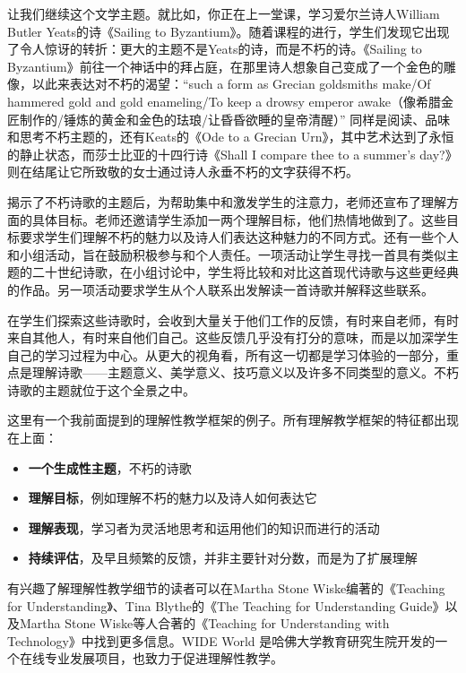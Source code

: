 让我们继续这个文学主题。就比如，你正在上一堂课，学习爱尔兰诗人William Butler Yeats的诗《Sailing to Byzantium》。随着课程的进行，学生们发现它出现了令人惊讶的转折：更大的主题不是Yeats的诗，而是不朽的诗。《Sailing to Byzantium》前往一个神话中的拜占庭，在那里诗人想象自己变成了一个金色的雕像，以此来表达对不朽的渴望：“such a form as Grecian goldsmiths make/Of hammered gold and gold enameling/To keep a drowsy emperor awake（像希腊金匠制作的/锤炼的黄金和金色的珐琅/让昏昏欲睡的皇帝清醒）” 同样是阅读、品味和思考不朽主题的，还有Keats的《Ode to a Grecian Urn》，其中艺术达到了永恒的静止状态，而莎士比亚的十四行诗《Shall I compare thee to a summer’s day?》则在结尾让它所致敬的女士通过诗人永垂不朽的文字获得不朽。

揭示了不朽诗歌的主题后，为帮助集中和激发学生的注意力，老师还宣布了理解方面的具体目标。老师还邀请学生添加一两个理解目标，他们热情地做到了。这些目标要求学生们理解不朽的魅力以及诗人们表达这种魅力的不同方式。还有一些个人和小组活动，旨在鼓励积极参与和个人责任。一项活动让学生寻找一首具有类似主题的二十世纪诗歌，在小组讨论中，学生将比较和对比这首现代诗歌与这些更经典的作品。另一项活动要求学生从个人联系出发解读一首诗歌并解释这些联系。

在学生们探索这些诗歌时，会收到大量关于他们工作的反馈，有时来自老师，有时来自其他人，有时来自他们自己。这些反馈几乎没有打分的意味，而是以加深学生自己的学习过程为中心。从更大的视角看，所有这一切都是学习体验的一部分，重点是理解诗歌——主题意义、美学意义、技巧意义以及许多不同类型的意义。不朽诗歌的主题就位于这个全景之中。

这里有一个我前面提到的理解性教学框架的例子。所有理解教学框架的特征都出现在上面：
\begin{itemize}
    \item \textbf{一个生成性主题}，不朽的诗歌
    \item \textbf{理解目标}，例如理解不朽的魅力以及诗人如何表达它
    \item \textbf{理解表现}，学习者为灵活地思考和运用他们的知识而进行的活动
    \item \textbf{持续评估}，及早且频繁的反馈，并非主要针对分数，而是为了扩展理解
\end{itemize}
	
有兴趣了解理解性教学细节的读者可以在Martha Stone Wiske编著的《Teaching for Understanding》、Tina Blythe的《The Teaching for Understanding Guide》以及Martha Stone Wiske等人合著的《Teaching for Understanding with Technology》中找到更多信息。WIDE World 是哈佛大学教育研究生院开发的一个在线专业发展项目，也致力于促进理解性教学。

